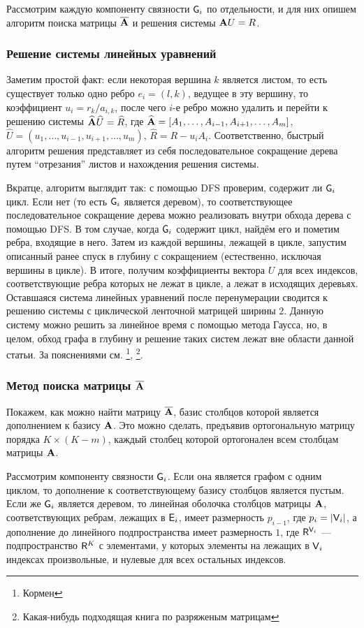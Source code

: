 \documentclass[12pt,a4paper]{article}
\begin{document}
Рассмотрим каждую компоненту связности $\mathsf{G}_i$ по отдельности, и для них опишем алгоритм поиска матрицы $\overline {\mathbf{A}}$ и решения системы $\mathbf{A} U = R$.
\subsubsection{Решение системы линейных уравнений}
Заметим простой факт: если некоторая вершина $k$ является листом, то есть существует только одно ребро $e_i = (l, k)$, ведущее в эту вершину, то коэффициент $u_i = r_k / a_{i, k}$, после чего $i$-е ребро можно удалить и перейти к решению системы $\widehat {\mathbf{A}} \widehat U = \widehat R$, где $\widehat {\mathbf{A}} = [A_1, \ldots, A_{i-1}, A_{i+1}, \ldots, A_m]$, $\widehat U = (u_1, \ldots, u_{i - 1}, u_{i + 1}, \ldots, u_m)$, $\widehat R = R - u_i A_i$. Соответственно, быстрый алгоритм решения представляет из себя последовательное сокращение дерева путем ``отрезания'' листов и нахождения решения системы.

Вкратце, алгоритм выглядит так: с помощью DFS проверим, содержит ли $\mathsf{G}_i$ цикл. Если нет (то есть $\mathsf{G}_i$ является деревом), то соответствующее последовательное сокращение дерева можно реализовать внутри обхода дерева с помощью DFS. В том случае, когда $\mathsf{G}_i$ содержит цикл, найдём его и пометим ребра, входящие в него. Затем из каждой вершины, лежащей в цикле, запустим описанный ранее спуск в глубину с сокращением (естественно, исключая вершины в цикле). В итоге, получим коэффициенты вектора $U$ для всех индексов, соответствующие ребра которых не лежат в цикле, а лежат в исходящих деревьях. Оставшаяся система линейных уравнений после перенумерации сводится к решению системы с циклической ленточной матрицей ширины $2$. Данную систему можно решить за линейное время с помощью метода Гаусса, но, в целом, обход графа в глубину и решение таких систем лежат вне области данной статьи. За пояснениями см. \footnote{Кормен}, \footnote{Какая-нибудь подходящая книга по разряженым матрицам}.
\subsubsection{Метод поиска матрицы $\overline {\mathbf{A}}$}
Покажем, как можно найти матрицу $\overline {\mathbf{A}}$, базис столбцов которой является дополнением к базису $\mathbf{A}$. Это можно сделать, предъявив ортогональную матрицу порядка $K \times (K-m)$, каждый столбец которой ортогонален всем столбцам матрицы $\mathbf{A}$.

Рассмотрим компоненту связности $\mathsf{G}_i$. Если она является графом с одним циклом, то дополнение к соответствующему базису столбцов является пустым. Если же $\mathsf{G}_i$ является деревом, то линейная оболочка столбцов матрицы $\mathbf{A}$, соответствующих ребрам, лежащих в $\mathsf{E}_i$, имеет размерность $p_{i-1}$, где $p_i = | \mathsf{V}_i |$, а дополнение до линейного подпространства имеет размерность $1$, где $\mathsf{R}^{\mathsf{V}_i}$ --- подпространство $\mathsf{R}^K$ с элементами, у которых элементы на лежащих в $\mathsf{V}_i$ индексах произвольные, и нулевые для всех остальных индексов.
\end{document}
